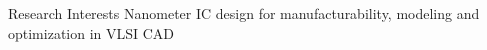 
\begin{rSection}{Research Interests}
    Nanometer IC design for manufacturability, modeling and optimization in VLSI CAD
\end{rSection}

